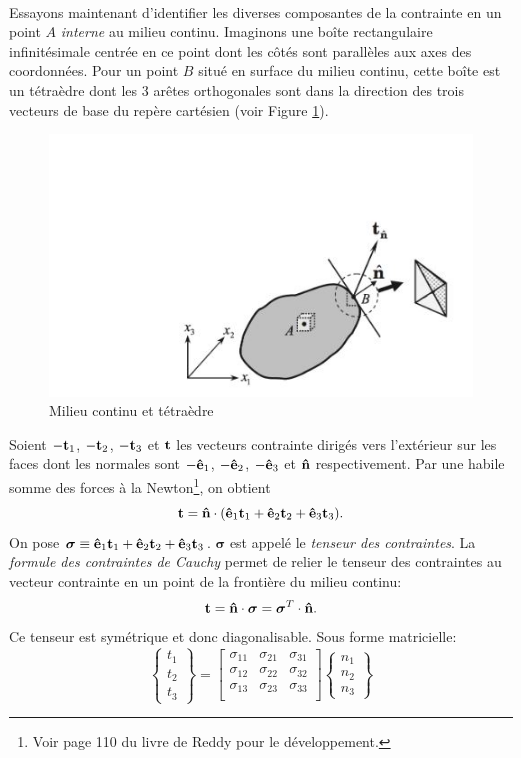 \paragraph{}
Essayons maintenant d'identifier les diverses composantes de la contrainte en un point $A$ \emph{interne} au milieu continu. Imaginons une boîte rectangulaire infinitésimale centrée en ce point dont les côtés sont parallèles aux axes des coordonnées. Pour un point $B$ situé en surface du milieu continu, cette boîte est un tétraèdre dont les 3 arêtes orthogonales sont dans la direction des trois vecteurs de base du repère cartésien (voir Figure \ref{fig:tetra}).
\begin{figure}[!h]
 \centering
 \includegraphics[scale=0.65]{./patate.jpg}
 \caption{Milieu continu et tétraèdre}
 \label{fig:tetra}
 \end{figure}
  Soient $-\textbf{t}_1$, $-\textbf{t}_2$, $-\textbf{t}_3$ et $ \textbf{t}$ les vecteurs contrainte dirigés vers l'extérieur sur les faces dont les normales sont $-\textbf{ê}_1$,  $-\textbf{ê}_2$, $-\textbf{ê}_3$ et $\textbf{\^n}$ respectivement. Par une habile somme des forces à la Newton\footnote{Voir page 110 du livre de Reddy pour le développement.}, on obtient $$\textbf{t}=\textbf{\^n}\cdot(\textbf{ê}_1\textbf{t}_1+\textbf{ê}_2\textbf{t}_2+\textbf{ê}_3\textbf{t}_3).$$
On pose $\boldsymbol{\sigma}\equiv\textbf{ê}_1\textbf{t}_1+\textbf{ê}_2\textbf{t}_2+\textbf{ê}_3\textbf{t}_3$. $\boldsymbol{\sigma}$ est appelé le \emph{tenseur des contraintes}. La \emph{formule des contraintes de Cauchy} permet de relier le tenseur des contraintes au vecteur contrainte en un point de la frontière du milieu continu:
$$\textbf{t}=\textbf{\^n}\cdot\boldsymbol{\sigma}=\boldsymbol{\sigma}^T\cdot\textbf{\^n}.$$
Ce tenseur est symétrique et donc diagonalisable. Sous forme matricielle:
$$\left\{\begin{array}{c}
t_1\\
t_2\\
t_3
\end{array}\right\}
=\left[
\begin{array}{ccc}
\sigma_{11}&\sigma_{21}&\sigma_{31}\\
\sigma_{12}&\sigma_{22}&\sigma_{32}\\
\sigma_{13}&\sigma_{23}&\sigma_{33}\\
\end{array} \right]
\left\{\begin{array}{c}
n_1\\
n_2\\
n_3
\end{array}\right\}$$

